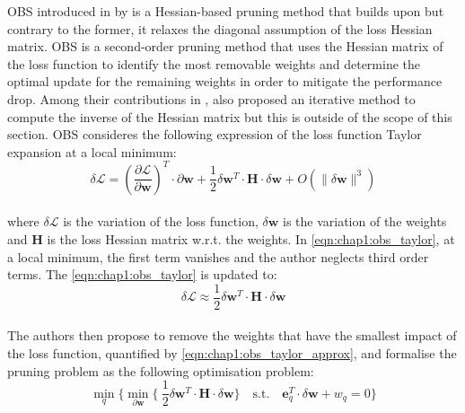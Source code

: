 \ac{OBS} introduced in \cite{DBLP:conf/nips/HassibiS92} by
\citeauthor{DBLP:conf/nips/HassibiS92} is a Hessian-based pruning method that builds
upon \cite{DBLP:conf/nips/CunDS89} but contrary to the former, it relaxes the
diagonal assumption of the loss Hessian matrix. \ac{OBS} is a second-order
pruning method that uses the Hessian matrix of the loss function to identify the
most removable weights and determine the optimal update for the remaining
weights in order to mitigate the performance drop. Among their contributions in
\cite{DBLP:conf/nips/HassibiS92}, \cite{DBLP:conf/nips/HassibiS92} also proposed
an iterative method to compute the inverse of the Hessian matrix but this is
outside of the scope of this section. \ac{OBS} consideres the following
expression of the loss function Taylor expansion at a local minimum:\\

\begin{equation}
  \label{eqn:chap1:obs_taylor}
  \delta \mathcal{L} = \left( \frac{\partial \mathcal{L}}{\partial \mathbf{w}} \right)^T \cdot  \partial \mathbf{w} + \frac{1}{2} \delta \mathbf{w}^T \cdot \mathbf{H} \cdot \delta \mathbf{w} + O(\| \delta \mathbf{w}\|^3)
\end{equation}\\

\noindent where $\delta \mathcal{L}$ is the variation of the loss function,
$\delta \mathbf{w}$ is the variation of the weights and $\mathbf{H}$ is the
loss Hessian matrix w.r.t. the weights. In \cref{eqn:chap1:obs_taylor}, at a
local minimum, the first term vanishes and the author neglects third order
terms. The \cref{eqn:chap1:obs_taylor} is updated to:\\

\begin{equation}
  \label{eqn:chap1:obs_taylor_approx}
  \delta \mathcal{L} \approx \frac{1}{2} \delta \mathbf{w}^T \cdot \mathbf{H} \cdot \delta \mathbf{w} 
\end{equation}\\

\noindent The authors then propose to remove the weights that have the smallest
impact of the loss function, quantified by \cref{eqn:chap1:obs_taylor_approx},
and formalise the pruning problem as the following optimisation problem:\\

\begin{equation}
  \label{eqn:chap1:obs_optimisation}
  \min_{q}\{\min_{\partial \mathbf{w}} \{\ \frac{1}{2} \delta \mathbf{w}^T \cdot \mathbf{H} \cdot \delta \mathbf{w} \} \quad \text{s.t.} \quad  \mathbf{e}_q^T \cdot \delta \mathbf{w} + w_q = 0\} 
\end{equation}\\

